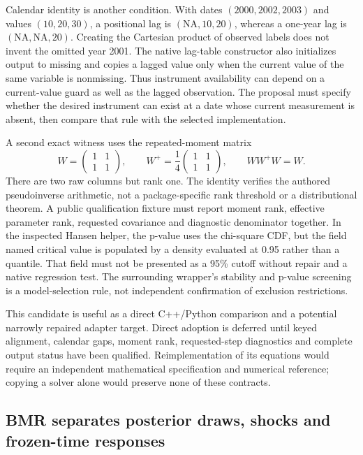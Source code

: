 Calendar identity is another condition. With dates $(2000,2002,2003)$ and values $(10,20,30)$, a positional lag is $(\mathrm{NA},10,20)$, whereas a one-year lag is $(\mathrm{NA},\mathrm{NA},20)$. Creating the Cartesian product of observed labels does not invent the omitted year 2001. The native lag-table constructor also initializes output to missing and copies a lagged value only when the current value of the same variable is nonmissing. Thus instrument availability can depend on a current-value guard as well as the lagged observation. The proposal must specify whether the desired instrument can exist at a date whose current measurement is absent, then compare that rule with the selected implementation.~\citep{exec25_cdyn_panelvar,exec25_cdyn_choice}

A second exact witness uses the repeated-moment matrix
\[
 W=\begin{pmatrix}1&1\\1&1\end{pmatrix},\qquad
 W^+=\frac14\begin{pmatrix}1&1\\1&1\end{pmatrix},\qquad WW^+W=W.
\]
There are two raw columns but rank one. The identity verifies the authored pseudoinverse arithmetic, not a package-specific rank threshold or a distributional theorem. A public qualification fixture must report moment rank, effective parameter rank, requested covariance and diagnostic denominator together. In the inspected Hansen helper, the p-value uses the chi-square CDF, but the field named critical value is populated by a density evaluated at 0.95 rather than a quantile. That field must not be presented as a 95\% cutoff without repair and a native regression test. The surrounding wrapper's stability and p-value screening is a model-selection rule, not independent confirmation of exclusion restrictions.~\citep{exec25_cdyn_panelvar,exec25_cdyn_choice}

This candidate is useful as a direct C++/Python comparison and a potential narrowly repaired adapter target. Direct adoption is deferred until keyed alignment, calendar gaps, moment rank, requested-step diagnostics and complete output status have been qualified. Reimplementation of its equations would require an independent mathematical specification and numerical reference; copying a solver alone would preserve none of these contracts.

\subsection{BMR separates posterior draws, shocks and frozen-time responses}

